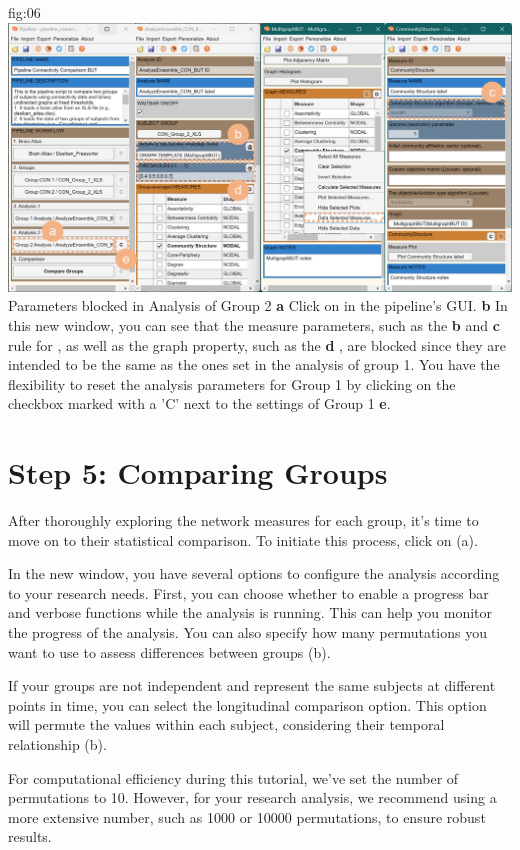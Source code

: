 \documentclass[justified]{tufte-handout}
\begin{document}
	{fig:06}
	{
	\includegraphics{fig06.jpg}
	}
	{Parameters blocked in Analysis of Group 2}
	{
	{\bf a} Click on  in the pipeline's GUI.
	{\bf b} In this new window, you can see that the measure parameters, such as the {\bf b}  and {\bf c} rule for , as well as the graph property, such as the {\bf d} , are blocked since they are intended to be the same as the ones set in the analysis of group 1. You have the flexibility to reset the analysis parameters for Group 1 by clicking on the checkbox marked with a 'C' next to the settings of Group 1 {\bf e}.
	}
 
\section{Step 5: Comparing Groups}

After thoroughly exploring the network measures for each group, it's time to move on to their statistical comparison. To initiate this process, click on  (a).

In the new window, you have several options to configure the analysis according to your research needs. First, you can choose whether to enable a progress bar and verbose functions while the analysis is running. This can help you monitor the progress of the analysis. You can also specify how many permutations you want to use to assess differences between groups (b).

If your groups are not independent and represent the same subjects at different points in time, you can select the longitudinal comparison option. This option will permute the values within each subject, considering their temporal relationship (b).

For computational efficiency during this tutorial, we've set the number of permutations to 10. However, for your research analysis, we recommend using a more extensive number, such as 1000 or 10000 permutations, to ensure robust results.
\end{document}
